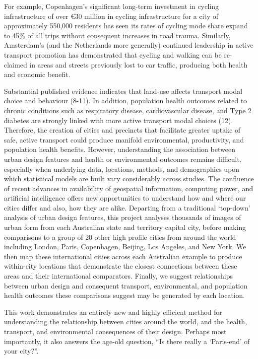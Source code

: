 \documentclass[final,3p,times,authoryear]{elsarticle}
\begin{document}
For example, Copenhagen's significant long-term investment in cycling infrastructure of over \euro 30 million in cycling infrastructure for a city of approximately 550,000 residents has seen its rates of cycling mode share expand to 45\% of all trips without consequent increases in road trauma. Similarly, Amsterdam's (and the Netherlands more generally) continued leadership in active transport promotion has demonstrated that cycling and walking can be re-claimed in areas and streets previously lost to car traffic, producing both health and economic benefit.

Substantial published evidence indicates that land-use affects transport modal choice and behaviour  (8-11). In addition, population health outcomes related to chronic conditions such as respiratory disease, cardiovascular disease, and Type 2 diabetes are strongly linked with more active transport modal choices  (12). Therefore, the creation of cities and precincts that facilitate greater uptake of safe, active transport could produce manifold environmental, productivity, and population health benefits. However, understanding the association between urban design features and health or environmental outcomes remains difficult, especially when underlying data, locations, methods, and demographics upon which statistical models are built vary considerably across studies. 
The confluence of recent advances in availability of geospatial information, computing power, and artificial intelligence offers new opportunities to understand how and where our cities differ and also, how they are alike. Departing from a traditional ‘top-down' analysis of urban design features, this project analyses thousands of images of urban form from each Australian state and territory capital city, before making comparisons to a group of 20 other high profile cities from around the world including London, Paris, Copenhagen, Beijing, Los Angeles, and New York. We then map these international cities across each Australian example to produce within-city locations that demonstrate the closest connections between these areas and their international comparators. Finally, we suggest relationships between urban design and consequent transport, environmental, and population health outcomes these comparisons suggest may be generated by each location.

This work demonstrates an entirely new and highly efficient method for understanding the relationship between cities around the world, and the health, transport, and environmental consequences of their design. Perhaps most importantly, it also answers the age-old question, ``Is there really a `Paris-end' of your city?''.
\end{document}
